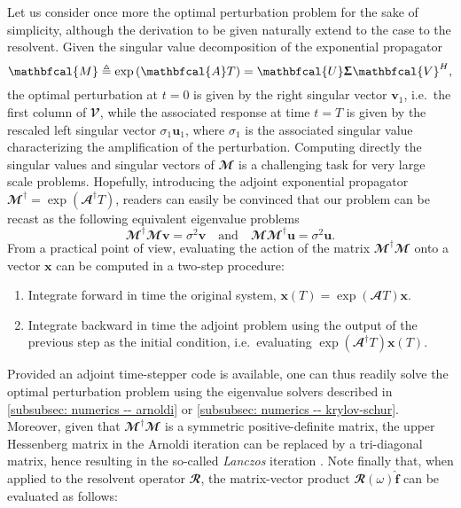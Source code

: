   Let us consider once more the optimal perturbation problem for the sake of simplicity, although the derivation to be given naturally extend to the case to the resolvent. Given the singular value decomposition of the exponential propagator
  \begin{equation}
    \mathbfcal{M} \triangleq \exp \left( \mathbfcal{A} T \right) = \mathbfcal{U} \boldsymbol{\Upsigma} \mathbfcal{V}^H,
    \notag
  \end{equation}
  the optimal perturbation at $t=0$ is given by the right singular vector $\mathbf{v}_1$, i.e.\ the first column of $\mathbfcal{V}$, while the associated response at time $t=T$ is given by the rescaled left singular vector $\sigma_1 \mathbf{u}_1$, where $\sigma_1$ is the associated singular value characterizing the amplification of the perturbation. Computing directly the singular values and singular vectors of $\mathbfcal{M}$ is a challenging task for very large scale problems. Hopefully, introducing the adjoint exponential propagator $\mathbfcal{M}^{\dagger} = \exp \left( \mathbfcal{A}^{\dagger} T \right)$, readers can easily be convinced that our problem can be recast as the following equivalent eigenvalue problems
  \begin{equation}
    \mathbfcal{M}^{\dagger} \mathbfcal{M} \mathbf{v} = \sigma^2 \mathbf{v} \quad \text{and} \quad \mathbfcal{M} \mathbfcal{M}^{\dagger} \mathbf{u} = \sigma^2 \mathbf{u}.
    \label{eq: numerics -- singular value decomposition as eigenvalue problem}
  \end{equation}
  From a practical point of view, evaluating the action of the matrix $\mathbfcal{M}^{\dagger} \mathbfcal{M}$ onto a vector $\mathbf{x}$ can be computed in a two-step procedure:
  \begin{enumerate}
    \item Integrate forward in time the original system, $\mathbf{x}(T) = \exp \left( \mathbfcal{A} T \right) \mathbf{x}$.
    \item Integrate backward in time the adjoint problem using the output of the previous step as the initial condition, i.e.\ evaluating $\exp \left( \mathbfcal{A}^{\dagger} T \right) \mathbf{x}(T)$.
  \end{enumerate}
  Provided an adjoint time-stepper code is available, one can thus readily solve the optimal perturbation problem using the eigenvalue solvers described in \textsection \ref{subsubsec: numerics -- arnoldi} or \textsection \ref{subsubsec: numerics -- krylov-schur}. Moreover, given that $\mathbfcal{M}^{\dagger} \mathbfcal{M}$ is a symmetric positive-definite matrix, the upper Hessenberg matrix in the Arnoldi iteration can be replaced by a tri-diagonal matrix, hence resulting in the so-called \emph{Lanczos} iteration \cite{L1950}. Note finally that, when applied to the resolvent operator $\mathbfcal{R}$, the matrix-vector product $\mathbfcal{R}(\omega) \hat{\mathbf{f}}$ can be evaluated as follows:
